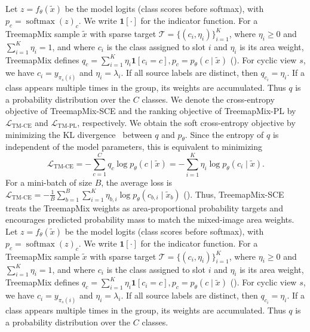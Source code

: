 Let $z=f_\theta(\tilde{x})$ be the model logits (class scores before softmax), with $p_c=\operatorname{softmax}(z)_c$. We write $\mathbf{1}[\cdot]$ for the indicator function. For a TreemapMix sample $\tilde{x}$ with sparse target \(\mathcal{T}=\{(c_i,\eta_i)\}_{i=1}^{K}\), where \(\eta_i\ge 0\) and \(\sum_{i=1}^{K}\eta_i=1\), and where $c_i$ is the class assigned to slot $i$ and $\eta_i$ is its area weight, TreemapMix defines \label{eq:soft-target}\(q_c=\sum_{i=1}^{K}\eta_i\mathbf{1}[c_i=c], p_c=p_\theta(c\mid\tilde{x})\)\textup{ (\theequation)}.
For cyclic view $s$, we have $c_i=y_{\pi_s(i)}$ and $\eta_i=\lambda_i$. If all source labels are distinct, then $q_{c_i}=\eta_i$. If a class appears multiple times in the group, its weights are accumulated. Thus $q$ is a probability distribution over the $C$ classes.
We denote the cross-entropy objective of TreemapMix-SCE and the ranking objective of TreemapMix-PL by $\mathcal{L}_{\mathrm{TM\text{-}CE}}$ and $\mathcal{L}_{\mathrm{TM\text{-}PL}}$, respectively. We obtain the soft cross-entropy objective by minimizing the KL divergence~\cite{kullback1951} between $q$ and $p_\theta$. Since the entropy of $q$ is independent of the model parameters, this is equivalent to minimizing
\begin{equation}
\label{eq:lm-ce}
\mathcal{L}_{\mathrm{TM\text{-}CE}}=-\sum_{c=1}^{C}q_c\log p_\theta(c\mid\tilde{x})=-\sum_{i=1}^{K}\eta_i\log p_\theta(c_i\mid\tilde{x}).
\end{equation}
For a mini-batch of size $B$, the average loss is \label{eq:lm-ce-batch}\(\mathcal{L}_{\mathrm{TM\text{-}CE}}=-\frac{1}{B}\sum_{b=1}^{B}\sum_{i=1}^{K}\eta_{b,i}\log p_\theta(c_{b,i}\mid\tilde{x}_b)\)\textup{ (\theequation)}.
Thus, TreemapMix-SCE treats the TreemapMix weights as area-proportional probability targets and encourages predicted probability mass to match the mixed-image area weights.
Let $z=f_\theta(\tilde{x})$ be the model logits (class scores before softmax), with $p_c=\operatorname{softmax}(z)_c$. We write $\mathbf{1}[\cdot]$ for the indicator function. For a TreemapMix sample $\tilde{x}$ with sparse target \(\mathcal{T}=\{(c_i,\eta_i)\}_{i=1}^{K}\), where \(\eta_i\ge 0\) and \(\sum_{i=1}^{K}\eta_i=1\), and where $c_i$ is the class assigned to slot $i$ and $\eta_i$ is its area weight, TreemapMix defines \label{eq:soft-target}\(q_c=\sum_{i=1}^{K}\eta_i\mathbf{1}[c_i=c], p_c=p_\theta(c\mid\tilde{x})\)\textup{ (\theequation)}.
For cyclic view $s$, we have $c_i=y_{\pi_s(i)}$ and $\eta_i=\lambda_i$. If all source labels are distinct, then $q_{c_i}=\eta_i$. If a class appears multiple times in the group, its weights are accumulated. Thus $q$ is a probability distribution over the $C$ classes.
